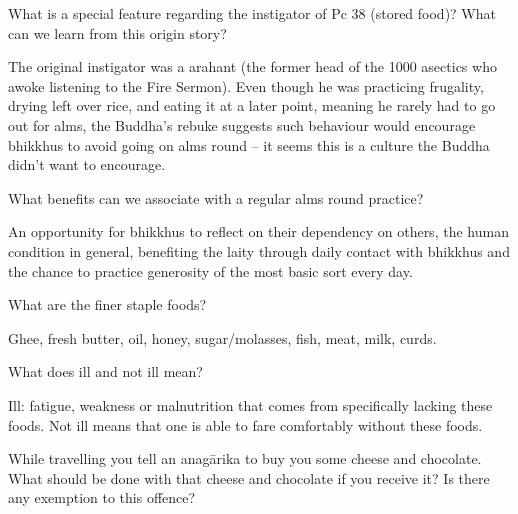 \bigskip


What is a special feature regarding the instigator of Pc 38 (stored food)? What
can we learn from this origin story?

\begin{solution}
  The original instigator was a arahant (the former head of the 1000 asectics
  who awoke listening to the Fire Sermon). Even though he was practicing
  frugality, drying left over rice, and eating it at a later point, meaning he
  rarely had to go out for alms, the Buddha’s rebuke suggests such behaviour
  would encourage bhikkhus to avoid going on alms round – it seems this is a
  culture the Buddha didn’t want to encourage.
\end{solution}

\bigskip

What benefits can we associate with a regular alms round practice?

\begin{solution}
  An opportunity for bhikkhus to reflect on their dependency on others, the
  human condition in general, benefiting the laity through daily contact with
  bhikkhus and the chance to practice generosity of the most basic sort every
  day.
\end{solution}

\bigskip

What are the finer staple foods?

\begin{solution}
  Ghee, fresh butter, oil, honey, sugar/molasses, fish, meat, milk, curds.
\end{solution}

\bigskip

What does ill and not ill mean?

\begin{solution}
  Ill: fatigue, weakness or malnutrition that comes from specifically lacking
  these foods. Not ill means that one is able to fare comfortably without these
  foods.
\end{solution}

\bigskip

While travelling you tell an anagārika to buy you some cheese and chocolate.
What should be done with that cheese and chocolate if you receive it? Is there
any exemption to this offence?

